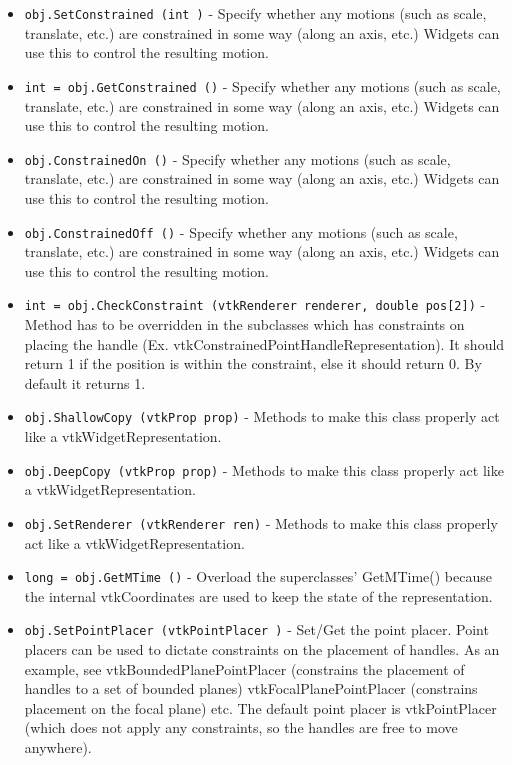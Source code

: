 \begin{itemize}
\item  \verb|obj.SetConstrained (int )| -  Specify whether any motions (such as scale, translate, etc.) are
 constrained in some way (along an axis, etc.) Widgets can use this
 to control the resulting motion.

\item  \verb|int = obj.GetConstrained ()| -  Specify whether any motions (such as scale, translate, etc.) are
 constrained in some way (along an axis, etc.) Widgets can use this
 to control the resulting motion.

\item  \verb|obj.ConstrainedOn ()| -  Specify whether any motions (such as scale, translate, etc.) are
 constrained in some way (along an axis, etc.) Widgets can use this
 to control the resulting motion.

\item  \verb|obj.ConstrainedOff ()| -  Specify whether any motions (such as scale, translate, etc.) are
 constrained in some way (along an axis, etc.) Widgets can use this
 to control the resulting motion.

\item  \verb|int = obj.CheckConstraint (vtkRenderer renderer, double pos[2])| -  Method has to be overridden in the subclasses which has
 constraints on placing the handle
 (Ex. vtkConstrainedPointHandleRepresentation). It should return 1
 if the position is within the constraint, else it should return
 0. By default it returns 1.

\item  \verb|obj.ShallowCopy (vtkProp prop)| -  Methods to make this class properly act like a vtkWidgetRepresentation.

\item  \verb|obj.DeepCopy (vtkProp prop)| -  Methods to make this class properly act like a vtkWidgetRepresentation.

\item  \verb|obj.SetRenderer (vtkRenderer ren)| -  Methods to make this class properly act like a vtkWidgetRepresentation.

\item  \verb|long = obj.GetMTime ()| -  Overload the superclasses' GetMTime() because the internal vtkCoordinates
 are used to keep the state of the representation.

\item  \verb|obj.SetPointPlacer (vtkPointPlacer )| -  Set/Get the point placer. Point placers can be used to dictate constraints 
 on the placement of handles. As an example, see vtkBoundedPlanePointPlacer
 (constrains the placement of handles to a set of bounded planes)
 vtkFocalPlanePointPlacer (constrains placement on the focal plane) etc.
 The default point placer is vtkPointPlacer (which does not apply any 
 constraints, so the handles are free to move anywhere).


\end{itemize}
